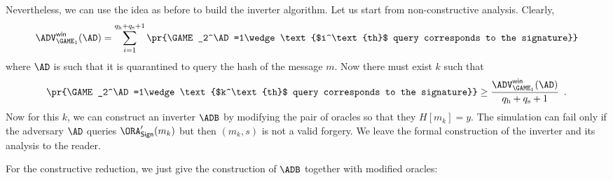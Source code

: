 \documentclass{crypto-exercise}
\newcommand{\qh}{q_{\text{h}}}
\newcommand{\qs}{q_{\text{s}}}
\newcommand{\ORAS}{\ORA_\SIGN}
\newcommand{\ADVWIN}[2]{\ADV^{\mathsf{win}}_{#1}(#2)}
\begin{document}
\begin{solution}
Nevertheless, we can use the idea as before to build the inverter algorithm. Let us start from non-constructive analysis. Clearly,
\begin{align*}
\ADVWIN{\GAME_1}{\AD}=\sum_{i=1}^{\qh+\qs+1}\pr{\GAME_2^\AD=1\wedge \text{$i^\text{th}$ query corresponds to the signature}}
\end{align*}
where $\AD$ is such that it is quarantined to query the hash of the message $m$. Now there must exist $k$ such that 
\begin{align*}
\pr{\GAME_2^\AD=1\wedge \text{$k^\text{th}$ query corresponds to the signature}}\geq 
\frac{\ADVWIN{\GAME_1}{\AD}}{\qh+\qs+1}\enspace.
\end{align*}
Now for this $k$, we can construct an inverter $\ADB$ by  modifying the pair of oracles so that they $H[m_k]=y$. The simulation can fail only if the adversary $\AD$ queries $\ORAS'(m_k)$ but then $(m_k,s)$ is not a valid forgery. We leave the formal construction of the inverter and its analysis to the reader.

For the constructive reduction, we just give the construction of $\ADB$ together with modified oracles:


\end{solution}
\end{document}
